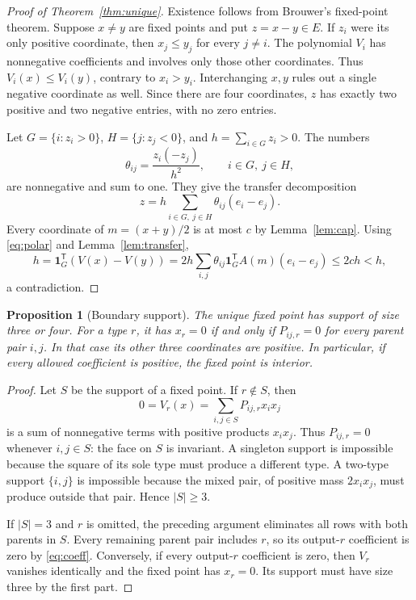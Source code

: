 \documentclass[11pt]{amsart}
\newtheorem{proposition}[theorem]{Proposition}
\theoremstyle{definition}
\newcommand{\one}{\mathbf 1}
\begin{document}
\begin{proof}[Proof of Theorem~\ref{thm:unique}]
Existence follows from Brouwer's fixed-point theorem. Suppose $x\ne y$ are fixed points and put $z=x-y\in E$. If $z_i$ were its only positive coordinate, then $x_j\le y_j$ for every $j\ne i$. The polynomial $V_i$ has nonnegative coefficients and involves only those other coordinates. Thus $V_i(x)\le V_i(y)$, contrary to $x_i>y_i$. Interchanging $x,y$ rules out a single negative coordinate as well. Since there are four coordinates, $z$ has exactly two positive and two negative entries, with no zero entries.

Let $G=\{i:z_i>0\}$, $H=\{j:z_j<0\}$, and $h=\sum_{i\in G}z_i>0$. The numbers
\[
 \theta_{ij}=\frac{z_i(-z_j)}{h^2},\qquad i\in G,\ j\in H,
\]
are nonnegative and sum to one. They give the transfer decomposition
\begin{equation}\label{eq:decomp}
 z=h\sum_{i\in G,\ j\in H}\theta_{ij}(e_i-e_j).
\end{equation}
Every coordinate of $m=(x+y)/2$ is at most $c$ by Lemma~\ref{lem:cap}. Using \eqref{eq:polar} and Lemma~\ref{lem:transfer},
\[
 h=\one_G^{\mathsf T}(V(x)-V(y))
   =2h\sum_{i,j}\theta_{ij}\one_G^{\mathsf T}A(m)(e_i-e_j)
   \le2ch<h,
\]
a contradiction.
\end{proof}

\begin{proposition}[Boundary support]\label{prop:support}
The unique fixed point has support of size three or four. For a type $r$, it has $x_r=0$ if and only if $P_{ij,r}=0$ for every parent pair $i,j$. In that case its other three coordinates are positive. In particular, if every allowed coefficient is positive, the fixed point is interior.
\end{proposition}
\begin{proof}
Let $S$ be the support of a fixed point. If $r\notin S$, then
\[
 0=V_r(x)=\sum_{i,j\in S}P_{ij,r}x_ix_j
\]
is a sum of nonnegative terms with positive products $x_ix_j$. Thus $P_{ij,r}=0$ whenever $i,j\in S$: the face on $S$ is invariant. A singleton support is impossible because the square of its sole type must produce a different type. A two-type support $\{i,j\}$ is impossible because the mixed pair, of positive mass $2x_ix_j$, must produce outside that pair. Hence $|S|\ge3$.

If $|S|=3$ and $r$ is omitted, the preceding argument eliminates all rows with both parents in $S$. Every remaining parent pair includes $r$, so its output-$r$ coefficient is zero by \eqref{eq:coeff}. Conversely, if every output-$r$ coefficient is zero, then $V_r$ vanishes identically and the fixed point has $x_r=0$. Its support must have size three by the first part.
\end{proof}
\end{document}
